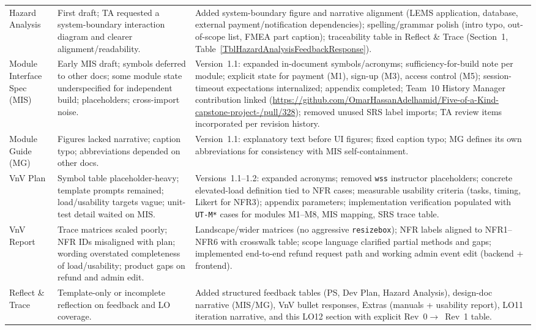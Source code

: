 \documentclass{article}
\begin{document}
\begin{longtable}{@{} p{2.35cm} p{4.55cm} p{6.1cm} @{}}
Hazard Analysis & First draft; TA requested a system-boundary interaction diagram and clearer alignment/readability. & Added system-boundary figure and narrative alignment (LEMS application, database, external payment/notification dependencies); spelling/grammar polish (intro typo, out-of-scope list, FMEA part caption); traceability table in Reflect \& Trace (Section~1, Table~\ref{TblHazardAnalysisFeedbackResponse}). \\

Module Interface Spec (MIS) & Early MIS draft; symbols deferred to other docs; some module state underspecified for independent build; placeholders; cross-import noise. & Version~1.1: expanded in-document symbols/acronyms; sufficiency-for-build note per module; explicit state for payment (M1), sign-up (M3), access control (M5); session-timeout expectations internalized; appendix completed; Team~10 History Manager contribution linked (\url{https://github.com/OmarHassanAdelhamid/Five-of-a-Kind-capstone-project-/pull/328}); removed unused SRS label imports; TA review items incorporated per revision history. \\

Module Guide (MG) & Figures lacked narrative; caption typo; abbreviations depended on other docs. & Version~1.1: explanatory text before UI figures; fixed caption typo; MG defines its own abbreviations for consistency with MIS self-containment. \\

VnV Plan & Symbol table placeholder-heavy; template prompts remained; load/usability targets vague; unit-test detail waited on MIS. & Versions~1.1--1.2: expanded acronyms; removed \texttt{wss} instructor placeholders; concrete elevated-load definition tied to NFR cases; measurable usability criteria (tasks, timing, Likert for NFR3); appendix parameters; implementation verification populated with \texttt{UT-M*} cases for modules M1--M8, MIS mapping, SRS trace table. \\

VnV Report & Trace matrices scaled poorly; NFR IDs misaligned with plan; wording overstated completeness of load/usability; product gaps on refund and admin edit. & Landscape/wider matrices (no aggressive \texttt{resizebox}); NFR labels aligned to NFR1--NFR6 with crosswalk table; scope language clarified partial methods and gaps; implemented end-to-end refund request path and working admin event edit (backend + frontend). \\

Reflect \& Trace & Template-only or incomplete reflection on feedback and LO coverage. & Added structured feedback tables (PS, Dev Plan, Hazard Analysis), design-doc narrative (MIS/MG), VnV bullet responses, Extras (manuals + usability report), LO11 iteration narrative, and this LO12 section with explicit Rev~0$\rightarrow$~Rev~1 table. \\


\end{longtable}
\end{document}
